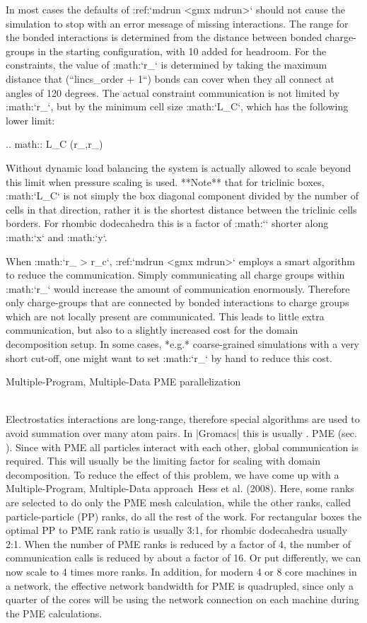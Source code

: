 In most cases the defaults of :ref:`mdrun <gmx mdrun>` should not cause the
simulation to stop with an error message of missing interactions. The
range for the bonded interactions is determined from the distance
between bonded charge-groups in the starting configuration, with 10%
added for headroom. For the constraints, the value of
:math:`r_{}` is determined by taking the maximum distance
that (``lincs_order + 1``) bonds can cover when they all
connect at angles of 120 degrees. The actual constraint communication is
not limited by :math:`r_{}`, but by the minimum cell size
:math:`L_C`, which has the following lower limit:

.. math:: L_C \geq \max(r_{},r_{})

Without dynamic load balancing the system is actually allowed to scale
beyond this limit when pressure scaling is used. **Note** that for
triclinic boxes, :math:`L_C` is not simply the box diagonal component
divided by the number of cells in that direction, rather it is the
shortest distance between the triclinic cells borders. For rhombic
dodecahedra this is a factor of :math:`` shorter along
:math:`x` and :math:`y`.

When :math:`r_{} > r_c`, :ref:`mdrun <gmx mdrun>` employs a
smart algorithm to reduce the communication. Simply communicating all
charge groups within :math:`r_{}` would increase the amount
of communication enormously. Therefore only charge-groups that are
connected by bonded interactions to charge groups which are not locally
present are communicated. This leads to little extra communication, but
also to a slightly increased cost for the domain decomposition setup. In
some cases, *e.g.* coarse-grained simulations with a very short cut-off,
one might want to set :math:`r_{}` by hand to reduce this
cost.

Multiple-Program, Multiple-Data PME parallelization
~~~~~~~~~~~~~~~~~~~~~~~~~~~~~~~~~~~~~~~~~~~~~~~~~~~

Electrostatics interactions are long-range, therefore special algorithms
are used to avoid summation over many atom pairs. In |Gromacs| this is
usually . PME (sec. 
). Since with PME all
particles interact with each other, global communication is required.
This will usually be the limiting factor for scaling with domain
decomposition. To reduce the effect of this problem, we have come up
with a Multiple-Program, Multiple-Data approach Hess et al. (2008).
Here, some ranks are selected to do only the PME mesh calculation, while
the other ranks, called particle-particle (PP) ranks, do all the rest of
the work. For rectangular boxes the optimal PP to PME rank ratio is
usually 3:1, for rhombic dodecahedra usually 2:1. When the number of PME
ranks is reduced by a factor of 4, the number of communication calls is
reduced by about a factor of 16. Or put differently, we can now scale to
4 times more ranks. In addition, for modern 4 or 8 core machines in a
network, the effective network bandwidth for PME is quadrupled, since
only a quarter of the cores will be using the network connection on each
machine during the PME calculations.

